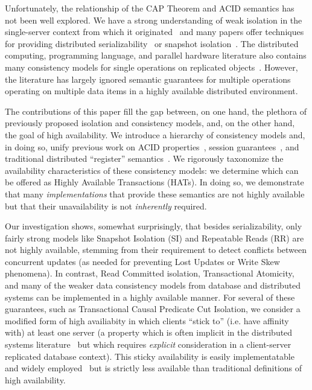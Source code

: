Unfortunately, the relationship of the CAP Theorem and ACID semantics
has not been well explored. We have a strong understanding of weak
isolation in the single-server context from which it
originated~\cite{adya, ansicritique, gray-isolation} and many papers
offer techniques for providing distributed
serializability~\cite{bernstein-concurrency, spanner, granola,
  daudjee-session, krikellas-bargain, calvin} or snapshot
isolation~\cite{daudjee-snapshot,generalizedsnapshot, kemme-snapshot,
  walter}. The distributed computing, programming language, and
parallel hardware literature also contains many consistency models for
single operations on replicated objects~\cite{pnuts, herlihy-art,
  cops, eiger, cac, sessionguarantees}. However, the literature has
largely ignored semantic guarantees for multiple operations operating
on multiple data items in a highly available distributed environment.

The contributions of this paper fill the gap between, on one hand, the
plethora of previously proposed isolation and consistency models, and,
on the other hand, the goal of high availability. We introduce a
hierarchy of consistency models and, in doing so, unify previous work
on ACID properties~\cite{adya}, session
guarantees~\cite{sessionguarantees}, and traditional distributed
``register'' semantics~\cite{herlihy-art}. We rigorously taxonomize
the availability characteristics of these consistency models: we
determine which can be offered as Highly Available Transactions
(HATs). In doing so, we demonstrate that many \textit{implementations}
that provide these semantics are not highly available but that their
unavailability is not \textit{inherently} required.

Our investigation shows, somewhat surprisingly, that besides
serializability, only fairly strong models like Snapshot Isolation
(SI) and Repeatable Reads (RR) are not highly available, stemming from
their requirement to detect conflicts between concurrent updates (as
needed for preventing Lost Updates or Write Skew phenomena). In
contrast, Read Committed isolation, Transactional Atomicity, and many
of the weaker data consistency models from database and distributed
systems can be implemented in a highly available manner. For several
of these guarantees, such as Transactional Causal Predicate Cut
Isolation, we consider a modified form of high availiabity in which
clients ``stick to'' (i.e. have affinity with) at least one server (a
property which is often implicit in the distributed systems
literature~\cite{herlihy-art, cops, eiger, cac} but which requires
\textit{explicit} consideration in a client-server replicated database
context). This sticky availability is easily implementatable and
widely employed~\cite{cops, eiger, vogels-defs} but is strictly less
available than traditional definitions of high availability.

